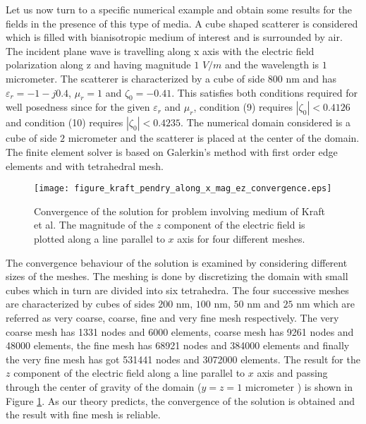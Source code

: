 Let us now turn to a specific numerical example and obtain some results for the fields in the presence of this type of media.
A cube shaped scatterer is considered which is filled with bianisotropic medium of interest and is surrounded by air.
The incident plane wave is travelling along x axis with the electric field polarization along z and having magnitude $1$ $V/m$ 
and the wavelength is $1$ micrometer.
The scatterer is characterized by a cube of side $800$ nm and has $\varepsilon_r = -1 - j0.4$, $\mu_r = 1$ and $\zeta_0 = -0.41$.
This satisfies both conditions required for well posedness since for the given $\varepsilon_r$ and $\mu_r$, 
condition (9) requires $|\zeta_0| < 0.4126$ and  condition (10) requires $|\zeta_0| < 0.4235$.
The numerical domain considered is a cube of side $2$ micrometer and the scatterer is placed at the center of the domain.
The finite element solver is based on Galerkin's method with first order edge elements and with tetrahedral mesh.

\begin{figure}
\texttt{[image: figure\_kraft\_pendry\_along\_x\_mag\_ez\_convergence.eps]}
\caption{Convergence of the solution for problem involving medium of Kraft et al.
The magnitude of the $z$ component of the electric field is plotted 
along a line parallel to $x$ axis for four different meshes.}
\label{fi:kraft_pendry_convergence}
\end{figure}

The convergence behaviour of the solution is examined by considering different sizes of the meshes.
The meshing is done by discretizing the domain with small cubes which in turn are divided into six tetrahedra.
The four successive meshes are characterized by cubes of sides $200$ nm, $100$ nm, $50$ nm and $25$ nm which are referred as 
very coarse, coarse, fine and very fine mesh respectively.
The very coarse mesh has 1331 nodes and 6000 elements, coarse mesh has  9261 nodes and 48000 elements, the fine mesh has 68921 nodes and 384000 elements and 
finally the very fine mesh has got 531441 nodes and 3072000 elements.
The result for the $z$ component of the electric field along a line parallel to $x$ axis 
and passing through the center of gravity of the domain ($y = z = 1$ micrometer ) 
is shown in Figure \ref{fi:kraft_pendry_convergence}.
As our theory predicts, the convergence of the solution is obtained and the result with fine mesh is reliable.


